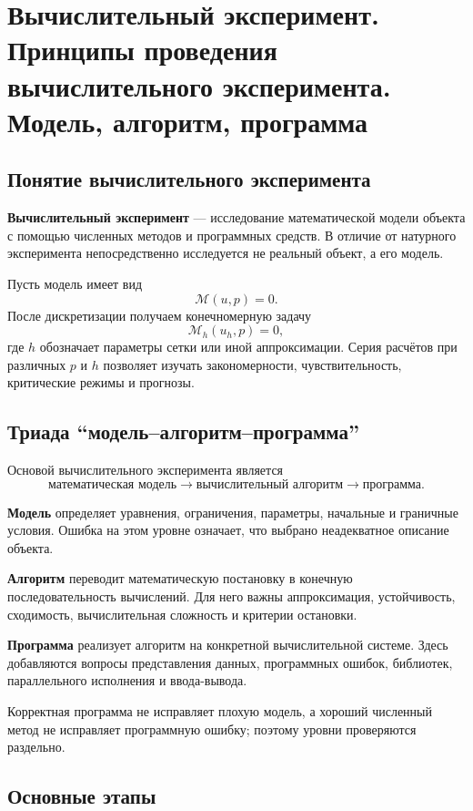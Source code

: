 \section{Вычислительный эксперимент. Принципы проведения вычислительного эксперимента. Модель, алгоритм, программа}

\subsection{Понятие вычислительного эксперимента}

\textbf{Вычислительный эксперимент} --- исследование математической модели объекта с помощью численных методов и программных средств. В отличие от натурного эксперимента непосредственно исследуется не реальный объект, а его модель.

Пусть модель имеет вид
\[
\mathcal M(u,p)=0.
\]
После дискретизации получаем конечномерную задачу
\[
\mathcal M_h(u_h,p)=0,
\]
где $h$ обозначает параметры сетки или иной аппроксимации. Серия расчётов при различных $p$ и $h$ позволяет изучать закономерности, чувствительность, критические режимы и прогнозы.

\subsection{Триада ``модель--алгоритм--программа''}

Основой вычислительного эксперимента является
\[
\boxed{
\text{математическая модель}
\longrightarrow
\text{вычислительный алгоритм}
\longrightarrow
\text{программа}}.
\]

\textbf{Модель} определяет уравнения, ограничения, параметры, начальные и граничные условия. Ошибка на этом уровне означает, что выбрано неадекватное описание объекта.

\textbf{Алгоритм} переводит математическую постановку в конечную последовательность вычислений. Для него важны аппроксимация, устойчивость, сходимость, вычислительная сложность и критерии остановки.

\textbf{Программа} реализует алгоритм на конкретной вычислительной системе. Здесь добавляются вопросы представления данных, программных ошибок, библиотек, параллельного исполнения и ввода-вывода.

Корректная программа не исправляет плохую модель, а хороший численный метод не исправляет программную ошибку; поэтому уровни проверяются раздельно.

\subsection{Основные этапы}

